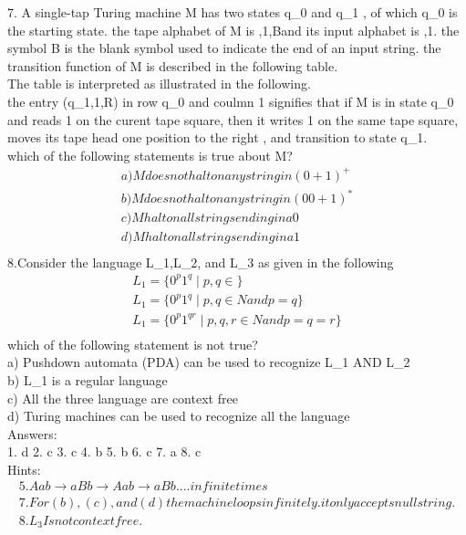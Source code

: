 \documentclass{book}
\begin{document}
7. A single-tap Turing machine M has two states q_{0} and q_{1} , of which  q_{0} is the starting state. the tape alphabet
of M is ,1,B\rbrace and its input alphabet is ,1\rbrace . the symbol B is the blank symbol used to indicate the end
of an input string. the transition function of M is described in the following table.\\

The table is interpreted as illustrated in the following.\\
the entry (q_{1},1,R) in row q_{0} and coulmn 1 signifies that if M is in state q_{0} and reads 1 on the curent tape square, then it writes 1 on the same tape square, moves its tape head one position to the right , and transition to state q_{1}.\\
which of the following  statements is true about M?\\
\begin{align}
a) M does not halt on any string in (0 +1 )^{+}\\
b)  M does not halt on any string in (00 +1 )^{\ast}\\
c)	 M halt on all strings ending in a 0\\
d)	M halt on all strings ending in a 1\\
\end{align}
8.Consider the language L_{1},L_{2}, and L_{3} as given in the following\\
\begin{align}
L_{1} = \lbrace 0^{p} 1^{q} \mid p,q \in \rbrace \\
L_{1} = \lbrace 0^{p} 1^{q} \mid p,q \in N  and p=q\rbrace \\
L_{1} = \lbrace 0^{p} 1^{qr} \mid p,q ,r\in  N and p=q=r\rbrace \\
\end{align}
 which of the following statement is not true?\\
 a) Pushdown automata (PDA) can be used to recognize L_{1} AND L_{2}\\ 
 b) L_{1} is a regular language\\
 c) All the three language are context free\\
 d) Turing machines can be used to recognize all the language\\

Answers:\\
1. d			2. c			3. c			4. b 			5. b 				6. c			7. a			8. c\\

Hints:\\
\begin{align}
5. Aab\rightarrow aBb \rightarrow Aab \longrightarrow aBb....infinite times\\
7. For (b),(c), and (d) the machine loops infinitely. it only accepts null string.\\
8. L_{3} Is not context free.\\
\end{align}
\end{document}
